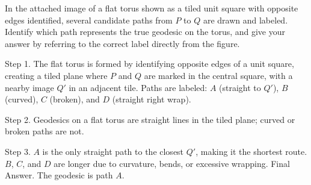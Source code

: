 In the attached image of a flat torus shown as a tiled unit square with opposite edges identified, several candidate paths from $P$ to $Q$ are drawn and labeled. Identify which path represents the true geodesic on the torus, and give your answer by referring to the correct label directly from the figure.

Step 1. The flat torus is formed by identifying opposite edges of a unit square, creating a tiled plane where $P$ and $Q$ are marked in the central square, with a nearby image $Q'$ in an adjacent tile. Paths are labeled: $A$ (straight to $Q'$), $B$ (curved), $C$ (broken), and $D$ (straight right wrap).

Step 2. Geodesics on a flat torus are straight lines in the tiled plane; curved or broken paths are not.

Step 3. $A$ is the only straight path to the closest $Q'$, making it the shortest route. $B$, $C$, and $D$ are longer due to curvature, bends, or excessive wrapping.
Final Answer. The geodesic is path $A$.